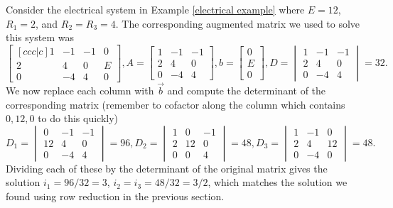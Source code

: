 \begin{example}
Consider the electrical system in Example \ref{electrical example} where $E=12$, $R_1=2$, and $R_2=R_3=4$. The corresponding augmented matrix we used to solve this system was 
$$
\begin{bmatrix}[ccc|c]
1&-1&-1&0\\
2&4&0&E\\
0&-4&4&0
\end{bmatrix}, 
A=
\begin{bmatrix}1&-1&-1\\2&4&0\\0&-4&4\end{bmatrix}, 
b=\begin{bmatrix}
0\\
E\\
0
\end{bmatrix},D=\begin{vmatrix} 1&-1&-1\\2&4&0\\0&-4&4 \end {vmatrix} =32. 
$$ 
We now replace each column with $\vec b$ and compute the determinant of the corresponding matrix (remember to cofactor along the column which contains $0,12,0$ to do this quickly)
$$ 
D_1=\begin{vmatrix} 0&-1&-1\\12&4&0\\0&-4&4 \end {vmatrix} =96,
D_2=\begin{vmatrix} 1&0&-1\\2&12&0\\0&0&4 \end {vmatrix} =48, 
D_3=\begin{vmatrix} 1&-1&0\\2&4&12\\0&-4&0 \end {vmatrix} =48. 
$$
Dividing each of these by the determinant of the original matrix gives the solution $i_1 = 96/32 = 3$, $i_2=i_3=48/32 = 3/2$, which matches the solution we found using row reduction in the previous section. 
\end{example}



















